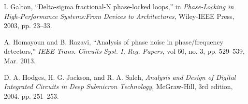 \begin{thebibliography}{}
 I. Galton, ``Delta-sigma fractional-N phase-locked loops,'' in {\em Phase-Locking in High-Performance Systems:From Devices to Architectures,} Wiley-IEEE Press, 2003, pp. 23--33.

 A. Homayoun and B. Razavi, ``Analysis of phase noise in phase/frequency detectors,'' {\em IEEE Trans. Circuits Syst. I, Reg. Papers,} vol 60, no. 3,
pp. 529--539, Mar. 2013.

 D. A. Hodges, H. G. Jackson, and R. A. Saleh, {\em Analysis and Design of Digital Integrated Circuits in Deep Submicron Technology,} McGraw-Hill, 3rd edition, 2004.
pp. 251--253.

\end{thebibliography}
 






